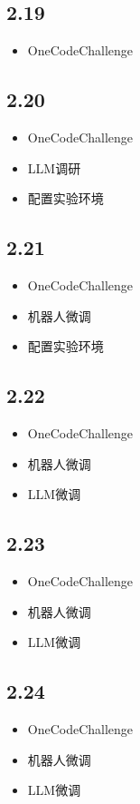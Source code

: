 \documentclass[UTF8]{ctexart}
\begin{document}
\subsection*{2.19}
\begin{itemize}
    \item OneCodeChallenge
\end{itemize}

\subsection*{2.20}
\begin{itemize}
    \item OneCodeChallenge
    \item LLM调研
    \item 配置实验环境
\end{itemize}

\subsection*{2.21}
\begin{itemize}
    \item OneCodeChallenge
    \item 机器人微调
    \item 配置实验环境
\end{itemize}

\subsection*{2.22}
\begin{itemize}
    \item OneCodeChallenge
    \item 机器人微调
    \item LLM微调
\end{itemize}

\subsection*{2.23}
\begin{itemize}
    \item OneCodeChallenge
    \item 机器人微调
    \item LLM微调
\end{itemize}

\subsection*{2.24}
\begin{itemize}
    \item OneCodeChallenge
    \item 机器人微调
    \item LLM微调
\end{itemize}
\end{document}
